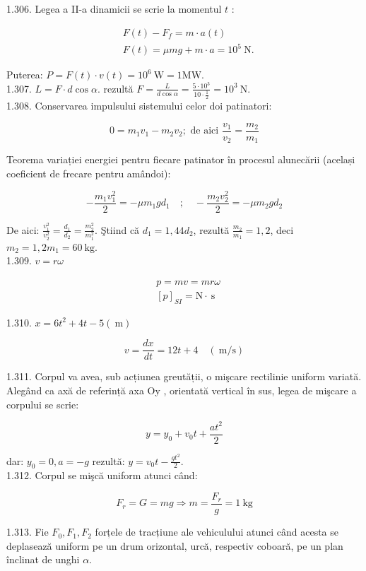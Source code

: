 1.306. Legea a II-a dinamicii se scrie la momentul $t$ :

$$
\begin{aligned}
& F(t)-F_{f}=m \cdot a(t) \\
& F(t)=\mu m g+m \cdot a=10^{5} \mathrm{~N} .
\end{aligned}
$$

Puterea: $P=F(t) \cdot v(t)=10^{6} \mathrm{~W}=1 \mathrm{MW}$.\\
1.307. $L=F \cdot d \cos \alpha$. rezultă $F=\frac{L}{d \cos \alpha}=\frac{5 \cdot 10^{3}}{10 \cdot \frac{1}{2}}=10^{3} \mathrm{~N}$.\\
1.308. Conservarea impulsului sistemului celor doi patinatori:

$$
0=m_{1} v_{1}-m_{2} v_{2} ; \text { de aici } \frac{v_{1}}{v_{2}}=\frac{m_{2}}{m_{1}}
$$

Teorema variației energiei pentru fiecare patinator în procesul alunecării (același coeficient de frecare pentru amândoi):

$$
-\frac{m_{1} v_{1}^{2}}{2}=-\mu m_{1} g d_{1} \quad ; \quad-\frac{m_{2} v_{2}^{2}}{2}=-\mu m_{2} g d_{2}
$$

De aici: $\frac{v_{1}^{2}}{v_{2}^{2}}=\frac{d_{1}}{d_{2}}=\frac{m_{2}^{2}}{m_{1}^{2}}$. Ştiind că $d_{1}=1,44 d_{2}$, rezultă $\frac{m_{2}}{m_{1}}=1,2$, deci $m_{2}=1,2 m_{1}=60 \mathrm{~kg}$.\\
1.309. $v=r \omega$

$$
\begin{aligned}
& p=m v=m r \omega \\
& {[p]_{S I}=\mathrm{N} \cdot \mathrm{~s}}
\end{aligned}
$$

1.310. $x=6 t^{2}+4 t-5(\mathrm{~m})$

$$
v=\frac{d x}{d t}=12 t+4 \quad(\mathrm{~m} / \mathrm{s})
$$

1.311. Corpul va avea, sub acțiunea greutății, o mişcare rectilinie uniform variată. Alegând ca axă de referință axa Oy , orientată vertical în sus, legea de mişcare a corpului se scrie:

$$
y=y_{0}+v_{0} t+\frac{a t^{2}}{2}
$$

dar: $y_{0}=0, a=-g$ rezultă: $y=v_{0} t-\frac{g t^{2}}{2}$.\\
1.312. Corpul se mişcă uniform atunci când:

$$
F_{r}=G=m g \Rightarrow m=\frac{F_{r}}{g}=1 \mathrm{~kg}
$$

1.313. Fie $F_{0}, F_{1}, F_{2}$ forțele de tracțiune ale vehiculului atunci când acesta se deplasează uniform pe un drum orizontal, urcă, respectiv coboară, pe un plan înclinat de unghi $\alpha$.

